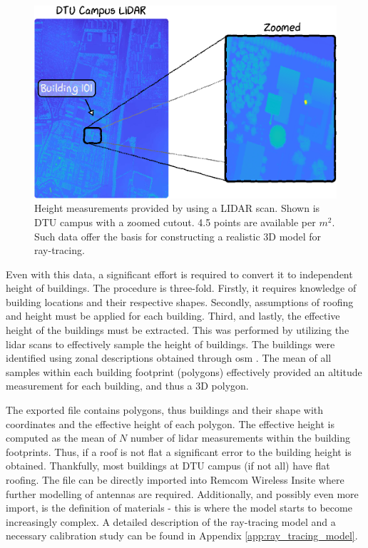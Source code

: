 \begin{figure}
    \centering
    \includegraphics[width=\textwidth]{chapters/part_pathloss/figures/LIDAR_example.eps}
    \caption{Height measurements provided by \cite{kortforsyningen} using a LIDAR scan. Shown is DTU campus with a zoomed cutout. 4.5 points are available per $m^2$. Such data offer the basis for constructing a realistic 3D model for ray-tracing.}
    \label{fig:lidar_data_example}
\end{figure}

Even with this data, a significant effort is required to convert it to independent height of buildings. The procedure is three-fold. Firstly, it requires knowledge of building locations and their respective shapes. Secondly, assumptions of roofing and height must be applied for each building. Third, and lastly, the effective height of the buildings must be extracted. This was performed by utilizing the \gls{lidar} scans to effectively sample the height of buildings. The buildings were identified using zonal descriptions obtained through \gls{osm} \cite{OpenstreetMapWiki}. The mean of all samples within each building footprint (polygons) effectively provided an altitude measurement for each building, and thus a 3D polygon.

The exported file contains polygons, thus buildings and their shape with coordinates and the effective height of each polygon. The effective height is computed as the mean of $N$ number of \gls{lidar} measurements within the building footprints. Thus, if a roof is not flat a significant error to the building height is obtained. Thankfully, most buildings at DTU campus (if not all) have flat roofing. The file can be directly imported into Remcom Wireless Insite where further modelling of antennas are required. Additionally, and possibly even more import, is the definition of materials - this is where the model starts to become increasingly complex. A detailed description of the ray-tracing model and a necessary calibration study can be found in Appendix \ref{app:ray_tracing_model}.

